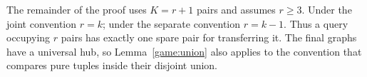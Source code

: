 \begin{remark}
\label{game:parameter}
The remainder of the proof uses $K=r+1$ pairs and assumes $r\geq3$.
Under the joint convention $r=k$; under the separate convention
$r=k-1$.  Thus a query occupying $r$ pairs has exactly one spare pair
for transferring it.  The final graphs have a universal hub, so
Lemma~\ref{game:union} also applies to the convention that compares
pure tuples inside their disjoint union.
\end{remark}
